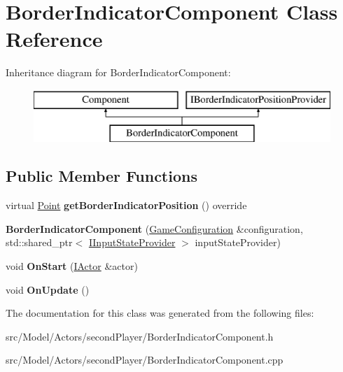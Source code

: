 \hypertarget{classBorderIndicatorComponent}{}\section{Border\+Indicator\+Component Class Reference}
\label{classBorderIndicatorComponent}
Inheritance diagram for Border\+Indicator\+Component\+:\begin{figure}[H]
\begin{center}
\leavevmode
\includegraphics[height=2.000000cm]{classBorderIndicatorComponent}
\end{center}
\end{figure}
\subsection*{Public Member Functions}
\begin{DoxyCompactItemize}
\item 
virtual \hyperlink{classPoint}{Point} {\bfseries get\+Border\+Indicator\+Position} () override\hypertarget{classBorderIndicatorComponent_aab0da56e04ed52b0fb2671a5a5b8e890}{}\label{classBorderIndicatorComponent_aab0da56e04ed52b0fb2671a5a5b8e890}

\item 
{\bfseries Border\+Indicator\+Component} (\hyperlink{classGameConfiguration}{Game\+Configuration} \&configuration, std\+::shared\+\_\+ptr$<$ \hyperlink{classIInputStateProvider}{I\+Input\+State\+Provider} $>$ input\+State\+Provider)\hypertarget{classBorderIndicatorComponent_a5c2510b41aefd2c314a6fd3521c73ca2}{}\label{classBorderIndicatorComponent_a5c2510b41aefd2c314a6fd3521c73ca2}

\item 
void {\bfseries On\+Start} (\hyperlink{classIActor}{I\+Actor} \&actor)\hypertarget{classBorderIndicatorComponent_ab3ec2039eacd57b7e69a718cfb2b1810}{}\label{classBorderIndicatorComponent_ab3ec2039eacd57b7e69a718cfb2b1810}

\item 
void {\bfseries On\+Update} ()\hypertarget{classBorderIndicatorComponent_a749a22b485f4a361203bf7d7eee7e728}{}\label{classBorderIndicatorComponent_a749a22b485f4a361203bf7d7eee7e728}

\end{DoxyCompactItemize}


The documentation for this class was generated from the following files\+:\begin{DoxyCompactItemize}
\item 
src/\+Model/\+Actors/second\+Player/Border\+Indicator\+Component.\+h\item 
src/\+Model/\+Actors/second\+Player/Border\+Indicator\+Component.\+cpp\end{DoxyCompactItemize}
